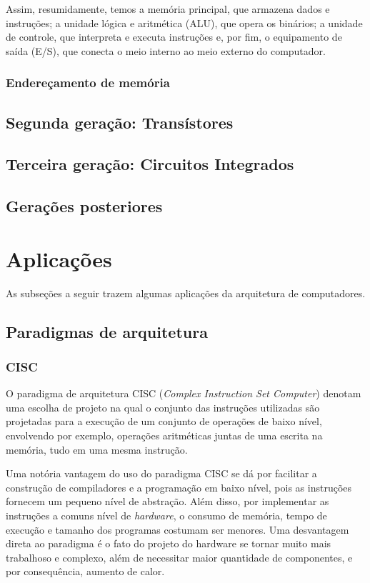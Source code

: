 \documentclass{article}
\begin{document}
Assim, resumidamente, temos a memória principal, que armazena dados e
instruções; a unidade lógica e aritmética (ALU), que opera os binários; a
unidade de controle, que interpreta e executa instruções e, por fim, o
equipamento de saída (E/S), que conecta o meio interno ao meio externo do
computador.

\subsubsection{Endereçamento de memória}

\subsection{Segunda geração: Transístores}
\subsection{Terceira geração: Circuitos Integrados}
\subsection{Gerações posteriores}

\section{Aplicações} 
As subseções a seguir trazem algumas aplicações da arquitetura de computadores.
\subsection{Paradigmas de arquitetura}

\subsubsection{CISC}
O paradigma de arquitetura CISC (\textit{Complex Instruction Set Computer})
denotam uma escolha de projeto na qual o conjunto das instruções utilizadas são
projetadas para a execução de um conjunto de operações de baixo nível,
envolvendo por exemplo, operações aritméticas juntas de uma escrita na memória,
tudo em uma mesma instrução.

Uma notória vantagem do uso do paradigma CISC se dá por facilitar a construção
de compiladores e a programação em baixo nível, pois as instruções fornecem um
pequeno nível de abstração. Além disso, por implementar as instruções a comuns
nível de \textit{hardware}, o consumo de memória, tempo de execução e tamanho dos
programas costumam ser menores. Uma desvantagem direta ao paradigma é o fato do
projeto do hardware se tornar muito mais trabalhoso e complexo, além de
necessitar maior quantidade de componentes, e por consequência, aumento de
calor.
\end{document}
